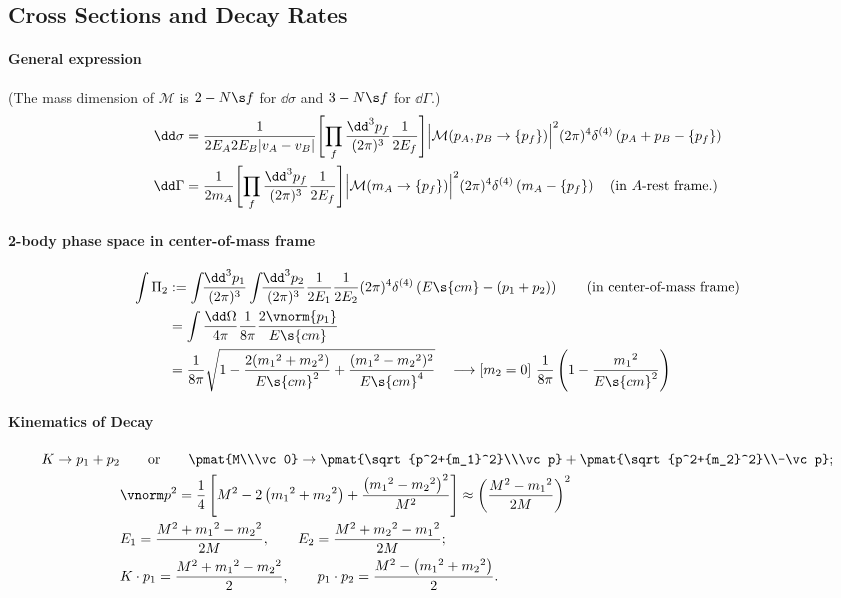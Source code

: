 \newpage

\subsection{Cross Sections and Decay Rates}
\paragraph{General expression}
{\small (The mass dimension of $\mathcal M$ is $2-N\s f$ for $\dd\sigma$ and $3-N\s f$ for $\dd\Gamma$.)}
\begin{align}
 \dd\sigma &=
\frac{1}{2E_A2E_B|v_A-v_B|}\Biggl[\prod_f\frac{\dd^3p_f}{(2\pi)^3}\frac{1}{2E_f}\Biggr]
\Bigl|\mathcal M(p_A,p_B\to\{p_f\})\Bigr|^2(2\pi)^4\delta^{(4)}\left(p_A+p_B-\{p_f\}\right)\\
 \dd\Gamma &=
\frac{1}{2m_A}\Biggl[\prod_f\frac{\dd^3p_f}{(2\pi)^3}\frac{1}{2E_f}\Biggr]
\Bigl|\mathcal M(m_A\to\{p_f\})\Bigr|^2(2\pi)^4\delta^{(4)}\left(m_A-\{p_f\}\right)
\quad \text{(in $A$-rest frame.)} 
\end{align}
\paragraph{2-body phase space in center-of-mass frame}
\begin{align}
 \int\Pi_2&:=
\intdP{p_1}\intdP{p_2}\frac{1}{2E_1}\frac{1}{2E_2}
(2\pi)^4\delta^{(4)}\left(E\s{cm}-(p_1+p_2)\right)\qquad\text{(in
 center-of-mass frame)}\\
&= \int\frac{\dd\Omega}{4\pi}\frac1{8\pi}\frac{2\vnorm{p_1}}{E\s{cm}}\\
&= \frac{1}{8\pi}
   \sqrt{1-\frac{2({m_1}^2+{m_2}^2)}{E\s{cm}^2}+\frac{({m_1}^2-{m_2}^2)^2}{E\s{cm}^4}}
\quad \longrightarrow [m_2=0]\ \frac{1}{8\pi}\left(1-\frac{{m_1}^2}{{E\s{cm}}^2}\right)
\end{align}
\paragraph{Kinematics of Decay}
\begin{align}
 K\to p_1 + p_2 &\qquad\text{or}\qquad
 \pmat{M\\\vc 0}\to\pmat{\sqrt{p^2+{m_1}^2}\\\vc p}+\pmat{\sqrt{p^2+{m_2}^2}\\-\vc p};\\
 & \vnorm p^2=\frac14\left[M^2-2\left({m_1}^2+{m_2}^2\right)+\frac{\left({m_1}^2-{m_2}^2\right)^2}{M^2}\right]
 \approx \left(\frac{M^2-{m_1}^2}{2M}\right)^2\notag\\
 &E_1=\frac{M^2+{m_1}^2-{m_2}^2}{2M},\qquad
  E_2=\frac{M^2+{m_2}^2-{m_1}^2}{2M};\notag\\
 &K\cdot p_1  = \frac{M^2+{m_1}^2-{m_2}^2}{2},\qquad
  p_1\cdot p_2= \frac{M^2-\left({m_1}^2+{m_2}^2\right)}2.\notag
\end{align}


